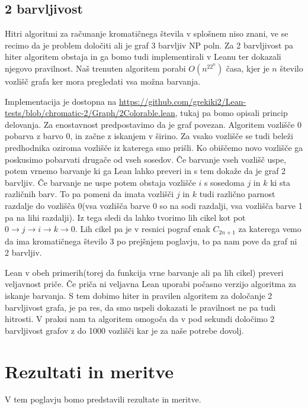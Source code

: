\documentclass[mat1]{fmfdelo}
\begin{document}
\subsection{2 barvljivost}
Hitri algoritmi za računanje kromatičnega števila v splošnem niso znani, 
ve se recimo da je problem določiti ali je graf 3 barvljiv NP poln.
Za 2 barvljivost pa hiter algoritem obstaja in ga bomo tudi implementirali v Leanu ter dokazali njegovo pravilnost. 
Naš trenuten algoritem porabi $O(n^22^n)$ časa, kjer je $n$ število vozlišč grafa ker mora pregledati vsa možna barvanja.

Implementacija je dostopna na \url{https://github.com/grekiki2/Lean-tests/blob/chromatic-2/Graph/2Colorable.lean}, tukaj pa
bomo opisali princip delovanja. 
Za enostavnost predpostavimo da je graf povezan.
Algoritem vozlišče $0$ pobarva z barvo $0$, in začne z iskanjem v širino. Za vsako vozlišče se tudi beleži
predhodnika oziroma vozlišče iz katerega smo prišli. Ko obiščemo novo vozlišče ga poskusimo pobarvati drugače od vseh sosedov.
Če barvanje vseh vozlišč uspe, potem vrnemo barvanje ki ga Lean lahko preveri in s tem dokaže da je graf 2 barvljiv.
Če barvanje ne uspe potem obstaja vozlišče $i$ s sosedoma $j$ in $k$ ki sta različnih barv. To pa pomeni da imata vozlišči $j$ in $k$
tudi različno parnost razdalje do vozlišča $0$(vsa vozlišča barve 0 so na sodi razdalji, vsa vozlišča barve 1 pa na lihi razdalji).
Iz tega sledi da lahko tvorimo lih cikel kot pot $0\to j\to i\to k\to 0$. Lih cikel pa je v resnici pograf enak $C_{2n+1}$ za katerega
vemo da ima kromatičnega število $3$ po prejšnjem poglavju, to pa nam pove da graf ni 2 barvljiv.

Lean v obeh primerih(torej da funkcija vrne barvanje ali pa lih cikel) preveri veljavnost priče. Če priča ni veljavna
Lean uporabi počasno verzijo algoritma za iskanje barvanja. 
S tem dobimo hiter in pravilen algoritem za določanje 2 barvljivost grafa, je pa res, da smo uspeli dokazati le pravilnost
ne pa tudi hitrosti. V praksi nam ta algoritem omogoča da v pod sekundi določimo 2 barvljivost grafov z do 1000 vozlišči
kar je za naše potrebe dovolj.

\section{Rezultati in meritve}
V tem poglavju bomo predstavili rezultate in meritve.
\end{document}
